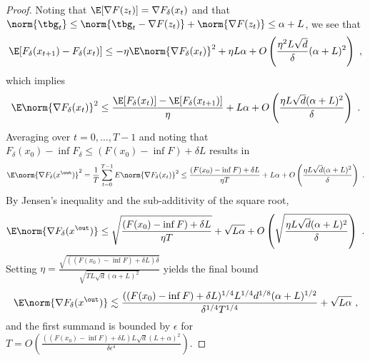 \begin{proof}
Noting that $\E[\nabla F(z_t)]=\nabla F_\delta(x_t)$
and that
$\norm{\tbg_t}\leq
\norm{\tbg_t-\nabla F(z_t)}+\norm{\nabla F(z_t)}
\leq \alpha+L$, we see that
\begin{align*}
    \E[F_{\delta}(x_{t+1})-F_{\delta}(x_{t})]
    \leq -\eta \E\norm{\nabla F_\delta (x_t)}^2+\eta L\alpha+O\left(\frac{\eta^2 L\sqrt{d}}{\delta}(\alpha+L)^2\right)~,
\end{align*}
which implies
\[
\E\norm{\nabla F_\delta (x_t)}^2 \leq \frac{\E[F_\delta(x_t)]-\E[F_\delta(x_{t+1})]}{\eta}+L\alpha+O\left(\frac{\eta L\sqrt{d}(\alpha+L)^2}{\delta}\right)~.
\]
Averaging over $t=0,\dots,T-1$ 
and noting that $F_\delta(x_0)-\inf F_\delta \leq (F(x_0)-\inf F) +\delta L$ results in
\[
\E\norm{\nabla F_\delta (x^{\out})}^2=\frac{1}{T}\sum_{t=0}^{T-1}E\norm{\nabla F_\delta (x_t)}^2
\leq \frac{(F(x_0)-\inf F)+\delta L}{\eta T}+L\alpha+O\left(\frac{\eta L\sqrt{d}(\alpha+L)^2}{\delta}\right)~.
\]
By Jensen's inequality and the sub-additivity of the square root,
\[
\E\norm{\nabla F_\delta (x^{\out})} \leq \sqrt{\frac{(F(x_0)-\inf F)+\delta L}{\eta T}}+\sqrt{L\alpha}+O\left(\sqrt{\frac{\eta L\sqrt{d}(\alpha+L)^2}{\delta}}\right)~.
\]
Setting $\eta=\frac{\sqrt{((F(x_0)-\inf F)+\delta L)\delta}}{\sqrt{T L\sqrt{d}(\alpha+L)^2}}$ yields the final bound
\[
\E\norm{\nabla F_\delta (x^{\out})} \lesssim
\frac{((F(x_0)-\inf F)+\delta L)^{1/4}L^{1/4}d^{1/8}(\alpha+L)^{1/2}}{\delta^{1/4}T^{1/4}}+\sqrt{L\alpha}~,
\]
and the first summand is bounded by $\epsilon$ for $T=O\left(\frac{((F(x_0)-\inf F)+\delta L) L \sqrt{d}(L+\alpha)^2}{\delta\epsilon^4}\right)$.



\end{proof}









